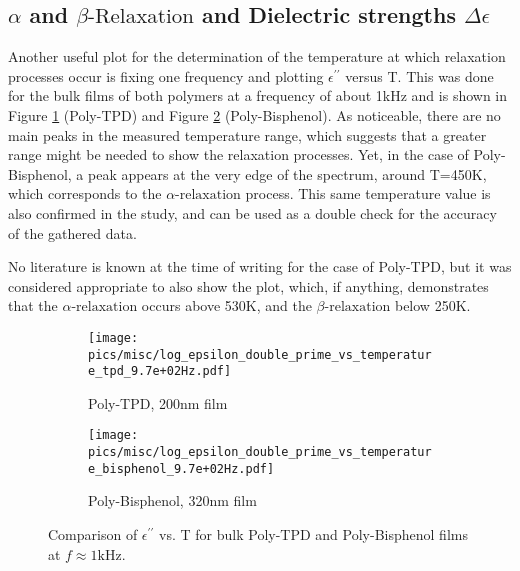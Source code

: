 
\subsection{$\alpha$ and $\beta\text{-Relaxation}$ and Dielectric strengths $\Delta\epsilon$}
Another useful plot for the determination of the temperature at which relaxation processes occur is fixing one frequency and plotting $\epsilon^{\prime\prime}$ versus T. This was done for the bulk films of both polymers at a frequency of about 1kHz and is shown in Figure \ref{epsvsttpd} (Poly-TPD) and Figure \ref{epsvstbisph} (Poly-Bisphenol).
As noticeable, there are no main peaks in the measured temperature range, which suggests that a greater range might be needed to show the relaxation processes. Yet, in the case of Poly-Bisphenol, a peak appears at the very edge of the spectrum, around T=450K, which corresponds to the $\alpha\text{-relaxation}$ process. This same temperature value is also confirmed in the study, and can be used as a double check for the accuracy of the gathered data. %

No literature is known at the time of writing for the case of Poly-TPD, but it was considered appropriate to also show the plot, which, if anything, demonstrates that the $\alpha\text{-relaxation}$ occurs above 530K, and the $\beta\text{-relaxation}$ below 250K.

\begin{figure}[!htb]
\centering
\begin{subfigure}[t]{.5\textwidth}
  \centering
  \texttt{[image: pics/misc/log\_epsilon\_double\_prime\_vs\_temperature\_tpd\_9.7e+02Hz.pdf]}
  \caption{Poly-TPD, 200nm film}
  \label{epsvsttpd}
\end{subfigure}%
\begin{subfigure}[t]{.5\textwidth}
  \centering
  \texttt{[image: pics/misc/log\_epsilon\_double\_prime\_vs\_temperature\_bisphenol\_9.7e+02Hz.pdf]}
  \caption{Poly-Bisphenol, 320nm film}
  \label{epsvstbisph}
\end{subfigure}
\caption{Comparison of $\epsilon^{\prime\prime}$ vs. T for bulk Poly-TPD and Poly-Bisphenol films at $f \approx 1\text{kHz}$.}
\label{epsvstcomparison}
\end{figure}


